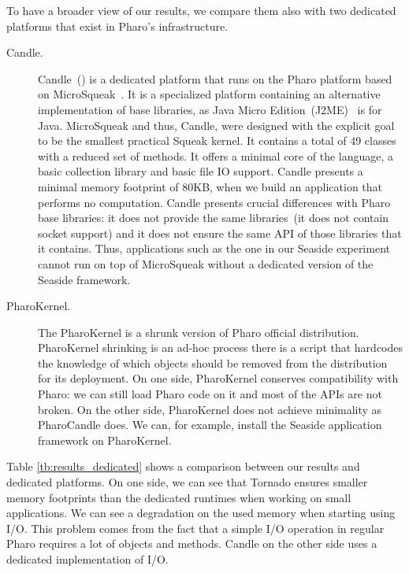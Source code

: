To have a broader view of our results, we compare them also with two dedicated platforms that exist in Pharo's infrastructure.

\begin{description}
\item[Candle.] Candle~() is a dedicated platform that runs on the Pharo platform based on MicroSqueak~\cite{Malo11a}. It is a specialized platform containing an alternative implementation of base libraries, as Java Micro Edition~(J2ME)~\cite{JavaME} is for Java. MicroSqueak and thus, Candle, were designed with the explicit goal to be the smallest practical Squeak kernel. It contains a total of 49 classes with a reduced set of methods. It offers a minimal core of the language, a basic collection library and basic file IO support. Candle presents a minimal memory footprint of 80KB, when we build an application that performs no computation.
Candle presents crucial differences with Pharo base libraries: it does not provide the same libraries~(\eg it does not contain socket support) and it does not ensure the same API of those libraries that it contains. Thus, applications such as the one in our Seaside experiment cannot run on top of MicroSqueak without a dedicated version of the Seaside framework.

\item[PharoKernel.] The PharoKernel is a shrunk version of Pharo official distribution. PharoKernel shrinking is an ad-hoc process \ie there is a script that hardcodes the knowledge of which objects should be removed from the distribution for its deployment. On one side, PharoKernel conserves compatibility with Pharo: we can still load Pharo code on it and most of the APIs are not broken. On the other side, PharoKernel does not achieve minimality as PharoCandle does. We can, for example, install the Seaside application framework on PharoKernel.

\end{description}

Table \ref{tb:results_dedicated} shows a comparison between our results and dedicated platforms. On one side, we can see that Tornado ensures smaller memory footprints than the dedicated runtimes when working on small applications. We can see a degradation on the used memory when starting using I/O. This problem comes from the fact that a simple I/O operation in regular Pharo requires a lot of objects and methods. Candle on the other side uses a dedicated implementation of I/O.


